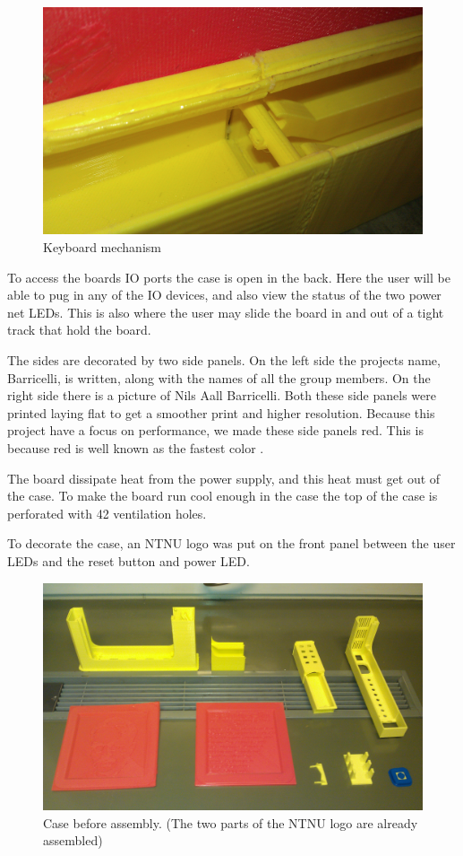 \begin{figure}[H]
\includegraphics[width=\textwidth,keepaspectratio,clip]{additional-components/keyboard-mechanism.jpg}%
\caption{Keyboard mechanism}
\end{figure}

To access the boards IO ports the case is open in the back.
Here the user will be able to pug in any of the IO devices, and also view the status of the two power net LEDs.
This is also where the user may slide the board in and out of a tight track that hold the board.

The sides are decorated by two side panels.
On the left side the projects name, Barricelli, is written, along with the names of all the group members.
On the right side there is a picture of Nils Aall Barricelli.
Both these side panels were printed laying flat to get a smoother print and higher resolution.
Because this project have a focus on performance, we made these side panels red.
This is because red is well known as the fastest color \cite{red-is-the-fastest-color}.

The board dissipate heat from the power supply, and this heat must get out of the case.
To make the board run cool enough in the case the top of the case is perforated with 42 ventilation holes.

To decorate the case, an NTNU logo was put on the front panel between the user LEDs and the reset button and power LED.

\begin{figure}[H]
\includegraphics[width=\textwidth,keepaspectratio,clip]{additional-components/case-parts.jpg}%
\caption{Case before assembly. (The two parts of the NTNU logo are already assembled)}
\end{figure}

